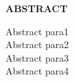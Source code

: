 \pagestyle{empty}
\begin{center}
\textup{\large{\textbf{ABSTRACT}}}
\end{center}
\begin{flushleft}
\textup{Abstract para1} \\[0.1in]
\textup{Abstract para2} \\[0.1in]
\textup{Abstract para3} \\[0.1in]
\textup{Abstract para4} \\[0.1in]
\end{flushleft}
\pagebreak
